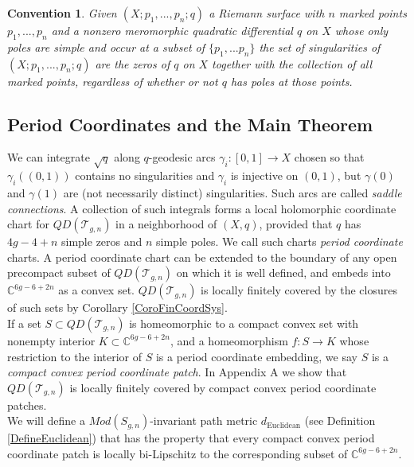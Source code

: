 \documentclass[12pt]{article}
\newtheorem{convention}[theorem]{Convention}
\newcommand{\cc}{\mathbb{C}}
\begin{document}
\begin{convention}Given $(X; p_1,...,p_n ;q)$ a Riemann surface with $n$ marked points $p_1,...,p_n$ and a nonzero meromorphic quadratic differential $q$ on $X$ whose only poles are simple and occur at a subset of $\{p_1,...p_n\}$ the set of \emph{singularities} of $(X; p_1,...,p_n ;q)$ are the zeros of $q$ on $X$ together with the collection of all marked points, regardless of whether or not $q$ has poles at those points.\end{convention}

\subsection{Period Coordinates and the Main Theorem}

\noindent We can integrate $\sqrt{q}$ along $q$-geodesic arcs $\gamma_i: [0,1] \to X$ chosen so that $\gamma_i((0,1))$ contains no singularities and $\gamma_i$ is injective on $(0,1)$, but $\gamma(0)$ and $\gamma(1)$ are (not necessarily distinct) singularities. Such arcs are called \emph{saddle connections}. A collection of such integrals forms a local holomorphic coordinate chart for $QD(\mathcal{T}_{g,n})$ in a neighborhood of $(X,q)$, provided that $q$ has $4g-4+n$ simple zeros and $n$ simple poles. We call such charts \emph{period coordinate} charts. A period coordinate chart can be extended to the boundary of any open precompact subset of $QD(\mathcal{T}_{g,n})$ on which it is well defined, and embeds into $\cc^{6g-6+2n}$ as a convex set. $QD(\mathcal{T}_{g,n})$ is locally finitely covered by the closures of such sets by Corollary \ref{CoroFinCoordSys}.\\

\noindent If a set $S \subset QD(\mathcal{T}_{g,n})$ is homeomorphic to a compact convex set with nonempty interior $K \subset \cc^{6g-6+2n}$, and a homeomorphism $f: S \to K$ whose restriction to the interior of $S$ is a period coordinate embedding, we say $S$ is a \emph{compact convex period coordinate patch}. In Appendix A we show that $QD(\mathcal{T}_{g,n})$ is locally finitely covered by compact convex period coordinate patches.\\

\noindent We will define a $Mod(S_{g,n})$-invariant path metric $d_\mathrm{Euclidean}$ (see Definition \ref{DefineEuclidean}) that has the property that every compact convex period coordinate patch is locally bi-Lipschitz to the corresponding subset of $\cc^{6g-6+2n}$.\\
\end{document}
